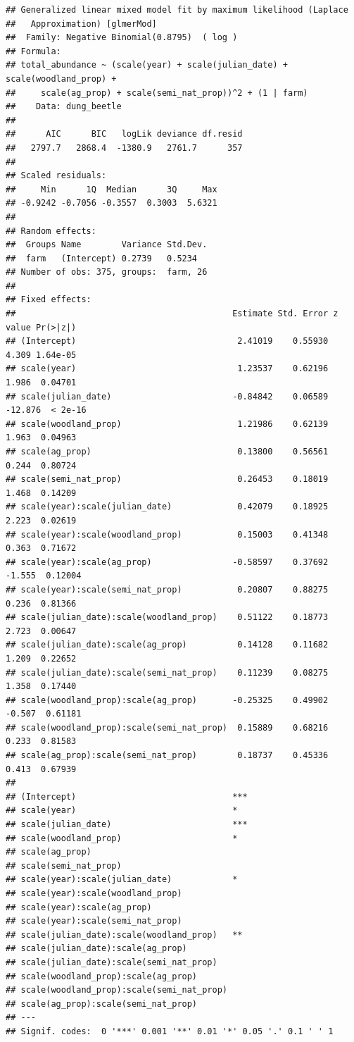 \documentclass[
]{article}
\begin{document}
\begin{verbatim}
## Generalized linear mixed model fit by maximum likelihood (Laplace
##   Approximation) [glmerMod]
##  Family: Negative Binomial(0.8795)  ( log )
## Formula: 
## total_abundance ~ (scale(year) + scale(julian_date) + scale(woodland_prop) +  
##     scale(ag_prop) + scale(semi_nat_prop))^2 + (1 | farm)
##    Data: dung_beetle
## 
##      AIC      BIC   logLik deviance df.resid 
##   2797.7   2868.4  -1380.9   2761.7      357 
## 
## Scaled residuals: 
##     Min      1Q  Median      3Q     Max 
## -0.9242 -0.7056 -0.3557  0.3003  5.6321 
## 
## Random effects:
##  Groups Name        Variance Std.Dev.
##  farm   (Intercept) 0.2739   0.5234  
## Number of obs: 375, groups:  farm, 26
## 
## Fixed effects:
##                                           Estimate Std. Error z value Pr(>|z|)
## (Intercept)                                2.41019    0.55930   4.309 1.64e-05
## scale(year)                                1.23537    0.62196   1.986  0.04701
## scale(julian_date)                        -0.84842    0.06589 -12.876  < 2e-16
## scale(woodland_prop)                       1.21986    0.62139   1.963  0.04963
## scale(ag_prop)                             0.13800    0.56561   0.244  0.80724
## scale(semi_nat_prop)                       0.26453    0.18019   1.468  0.14209
## scale(year):scale(julian_date)             0.42079    0.18925   2.223  0.02619
## scale(year):scale(woodland_prop)           0.15003    0.41348   0.363  0.71672
## scale(year):scale(ag_prop)                -0.58597    0.37692  -1.555  0.12004
## scale(year):scale(semi_nat_prop)           0.20807    0.88275   0.236  0.81366
## scale(julian_date):scale(woodland_prop)    0.51122    0.18773   2.723  0.00647
## scale(julian_date):scale(ag_prop)          0.14128    0.11682   1.209  0.22652
## scale(julian_date):scale(semi_nat_prop)    0.11239    0.08275   1.358  0.17440
## scale(woodland_prop):scale(ag_prop)       -0.25325    0.49902  -0.507  0.61181
## scale(woodland_prop):scale(semi_nat_prop)  0.15889    0.68216   0.233  0.81583
## scale(ag_prop):scale(semi_nat_prop)        0.18737    0.45336   0.413  0.67939
##                                              
## (Intercept)                               ***
## scale(year)                               *  
## scale(julian_date)                        ***
## scale(woodland_prop)                      *  
## scale(ag_prop)                               
## scale(semi_nat_prop)                         
## scale(year):scale(julian_date)            *  
## scale(year):scale(woodland_prop)             
## scale(year):scale(ag_prop)                   
## scale(year):scale(semi_nat_prop)             
## scale(julian_date):scale(woodland_prop)   ** 
## scale(julian_date):scale(ag_prop)            
## scale(julian_date):scale(semi_nat_prop)      
## scale(woodland_prop):scale(ag_prop)          
## scale(woodland_prop):scale(semi_nat_prop)    
## scale(ag_prop):scale(semi_nat_prop)          
## ---
## Signif. codes:  0 '***' 0.001 '**' 0.01 '*' 0.05 '.' 0.1 ' ' 1
\end{verbatim}
\end{document}
